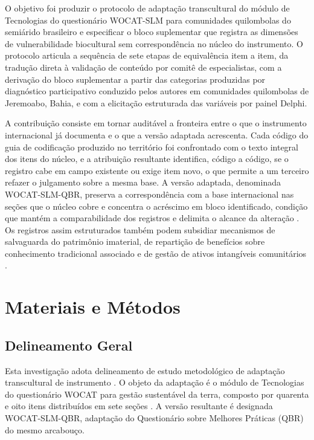 \documentclass[preprint,authoryear,12pt]{elsarticle}
\begin{document}
O objetivo foi produzir o protocolo de adaptação transcultural do módulo de Tecnologias do questionário WOCAT-SLM para comunidades quilombolas do semiárido brasileiro e especificar o bloco suplementar que registra as dimensões de vulnerabilidade biocultural sem correspondência no núcleo do instrumento. O protocolo articula a sequência de sete etapas de equivalência item a item, da tradução direta à validação de conteúdo por comitê de especialistas, com a derivação do bloco suplementar a partir das categorias produzidas por diagnóstico participativo conduzido pelos autores em comunidades quilombolas de Jeremoabo, Bahia, e com a elicitação estruturada das variáveis por painel Delphi.

A contribuição consiste em tornar auditável a fronteira entre o que o instrumento internacional já documenta e o que a versão adaptada acrescenta. Cada código do guia de codificação produzido no território foi confrontado com o texto integral dos itens do núcleo, e a atribuição resultante identifica, código a código, se o registro cabe em campo existente ou exige item novo, o que permite a um terceiro refazer o julgamento sobre a mesma base. A versão adaptada, denominada WOCAT-SLM-QBR, preserva a correspondência com a base internacional nas seções que o núcleo cobre e concentra o acréscimo em bloco identificado, condição que mantém a comparabilidade dos registros e delimita o alcance da alteração \citep{Herdman1999,Beaton2000}. Os registros assim estruturados também podem subsidiar mecanismos de salvaguarda do patrimônio imaterial, de repartição de benefícios sobre conhecimento tradicional associado e de gestão de ativos intangíveis comunitários \citep{Dutfield2004,Belletti2015,Robinson2014}.

\section{Materiais e Métodos}

\subsection{Delineamento Geral}

Esta investigação adota delineamento de estudo metodológico de adaptação transcultural de instrumento \citep{Herdman1999,Beaton2000,Borsa2018}. O objeto da adaptação é o módulo de Tecnologias do questionário WOCAT para gestão sustentável da terra, composto por quarenta e oito itens distribuídos em sete seções \citep{Liniger2019}. A versão resultante é designada WOCAT-SLM-QBR, adaptação do Questionário sobre Melhores Práticas (QBR) do mesmo arcabouço.
\end{document}

